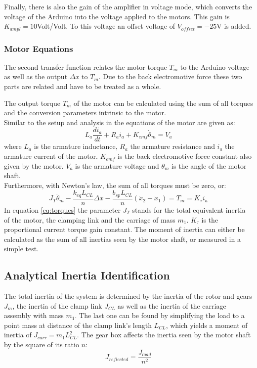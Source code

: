 Finally, there is also the gain of the amplifier in voltage mode, which converts the voltage of the Arduino into the voltage applied to the motors. This gain is $K_{ampl} = 10$Volt/Volt. To this voltage an offset voltage of $V_{offset} = -25$V is added.\\
	
\subsubsection{Motor Equations}
The second transfer function relates the motor torque $T_m$ to the Arduino voltage as well as the output $\Delta x$ to $T_m$. Due to the back electromotive force these two parts are related and have to be treated as a whole.
	
The output torque $T_m$ of the motor can be calculated using the sum of all torques and the conversion parameters intrinsic to the motor.\\
Similar to the setup and analysis in \cite{Junior2016} the equations of the motor are given as:
\begin{equation}
	L_a \frac{di_a}{dt} + R_a i_a + K_{emf} \dot{\theta }_m = V_a
\end{equation}
where $L_a$ is the armature inductance, $R_a$ the armature resistance and $i_a$ the armature current of the motor. $K_{emf}$ is the back electromotive force constant also given by the motor. $V_a$ is the armature voltage and $\theta_m$ is the angle of the motor shaft.\\
Furthermore, with Newton's law, the sum of all torques must be zero, or:
\begin{equation}
	J_{T} \ddot{\theta }_m - \frac{k_{eq} L_{CL}}{n} \Delta x - \frac{b_{sp} L_{CL}}{n} (\dot{x}_2 - \dot{x}_1)  = T_m = K_{\tau} i_a
	\label{eq:torques}
\end{equation}
In equation \ref{eq:torques} the parameter $J_{T}$ stands for the total equivalent inertia of the motor, the clamping link and the carriage of mass $m_1$.  $K_{\tau}$ is the proportional current torque gain constant. The moment of inertia can either be calculated as the sum of all inertias seen by the motor shaft, or measured in a simple test.\\ 
	
\subsection{Analytical Inertia Identification}
The total inertia of the system is determined by the inertia of the rotor and gears $J_m$, the inertia of the clamp link $J_{CL}$ as well as the inertia of the carriage assembly with mass $m_1$. The last one can be found by simplifying the load to a point mass at distance of the clamp link's length $L_{CL}$, which yields a moment of inertia of $J_{carr} = m_1 L_{CL}^2$.
The gear box affects the inertia seen by the motor shaft by the square of its ratio $n$:
\begin{equation}
	J_{reflected} = \frac{ J_{load}}{n^2}
\end{equation}

